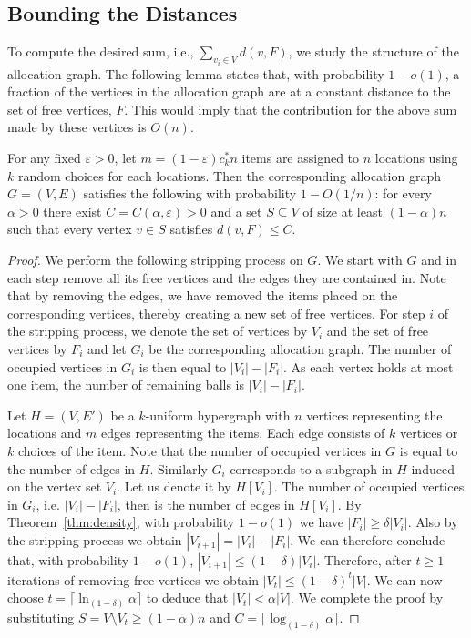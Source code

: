 \subsection{Bounding the Distances }
To compute the desired sum, i.e., $\sum_{v_i\in V}d(v,F)$, we study the structure of the allocation graph. The following lemma states that, with probability $1-o(1)$, a fraction of the vertices in the allocation graph are at a constant distance to the set of free vertices, $F$. This would imply that the contribution for the above sum made by these vertices is $O(n)$. 

\begin{lemma}\label{lem:dist}
For any fixed $\varepsilon>0$, let $m=(1-\varepsilon) c_k^* n$ items are assigned to $n$ locations using $k$ random choices for each locations. Then the corresponding allocation graph $G=(V,E)$ satisfies the following with probability $1-O(1/n)$: for every $\alpha >0$ there exist $C=C(\alpha, \varepsilon) >0$ and a set $S \subseteq V$ of size at least $(1-\alpha)n$ such that every vertex $v\in S$ satisfies $d(v,F)\le C$. \end{lemma}

\begin{proof}
We perform the following stripping process on $G$.
We start with $G$ and in each step remove all its free vertices and the edges they are contained in. Note that by removing the edges, we have removed the items placed on the corresponding vertices, thereby creating a new set of free vertices. For step $i$ of the stripping process, we denote the set of vertices by $V_i$ and the set of free vertices by $F_i$ and let $G_i$ be the corresponding allocation graph. The number of occupied vertices in $G_i$ is then equal to $|V_i|-|F_i|$. As each vertex holds at most one item, the number of remaining balls is $|V_i|-|F_i|$.

Let $H=(V,E')$ be a $k$-uniform hypergraph with $n$ vertices representing the locations and $m$ edges representing the items. Each edge consists of $k$ vertices or $k$ choices of the item.
Note that the number of occupied vertices in $G$ is equal to the number of edges in $H$. Similarly $G_i$ corresponds to a subgraph in $H$ induced on the vertex set $V_i$. Let us denote it by $H[V_i]$. 
The number of occupied vertices in $G_i$, i.e. $|V_{i}|-|F_{i}|$, then is the number of edges in $H[V_i]$. By Theorem~\ref{thm:density}, with probability $1-o(1)$ we have $|F_{i}|\ge \delta |V_{i}|$.  Also by the stripping process we obtain $|V_{i+1}| = |V_{i}|- |F_{i}| $. We can therefore conclude that, with probability $1-o(1)$,  $|V_{i+1}| \le (1-\delta) |V_{i}|$.
Therefore, after $t\ge 1$ iterations of removing free vertices we obtain  $|V_{t}|\le (1-\delta )^{t}|V|$. We can now choose $t=\lceil{\ln_{(1-\delta)}\alpha}\rceil$ to deduce that $ |V_{t}| <\alpha |V|$. We complete the proof by substituting $S= V\setminus V_t \ge (1-\alpha) n$ and $C= \lceil{\log_{(1-\delta)} \alpha}\rceil$.
\end{proof}

